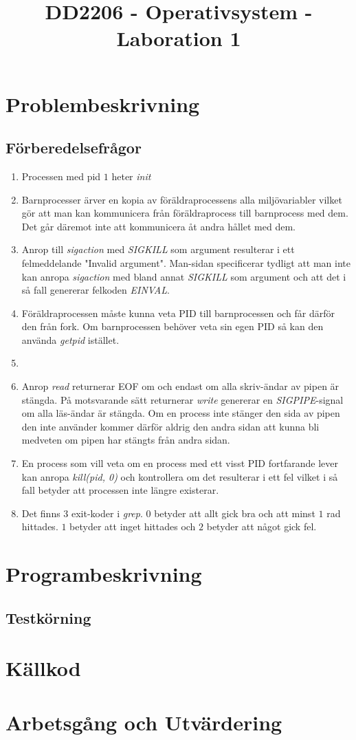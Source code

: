 \documentclass[10pt,a4paper]{article}
\title{DD2206 - Operativsystem - Laboration 1}
\begin{document}
\maketitle


\section{Problembeskrivning}

\subsection{Förberedelsefrågor}

\begin{enumerate}
\item Processen med pid $1$ heter \emph{init}
\item Barnprocesser ärver en kopia av föräldraprocessens alla miljövariabler vilket gör att man kan kommunicera från föräldraprocess till barnprocess med dem. Det går däremot inte att kommunicera åt andra hållet med dem.
\item Anrop till \emph{sigaction} med \emph{SIGKILL} som argument resulterar i ett felmeddelande "Invalid argument". Man-sidan specificerar tydligt att man inte kan anropa \emph{sigaction} med bland annat \emph{SIGKILL} som argument och att det i så fall genererar felkoden \emph{EINVAL}. 
\item Föräldraprocessen måste kunna veta PID till barnprocessen och får därför den från fork. Om barnprocessen behöver veta sin egen PID så kan den använda \emph{getpid} istället.
\item 
\item Anrop \emph{read} returnerar EOF om och endast om alla skriv-ändar av pipen är stängda. På motsvarande sätt returnerar \emph{write} genererar en \emph{SIGPIPE}-signal om alla läs-ändar är stängda. Om en process inte stänger den sida av pipen den inte använder kommer därför aldrig den andra sidan att kunna bli medveten om pipen har stängts från andra sidan.
\item En process som vill veta om en process med ett visst PID fortfarande lever kan anropa \emph{kill(pid, 0)} och kontrollera om det resulterar i ett fel vilket i så fall betyder att processen inte längre existerar.
\item Det finns 3 exit-koder i \emph{grep}. $0$ betyder att allt gick bra och att minst $1$ rad hittades. $1$ betyder att inget hittades och $2$ betyder att något gick fel.
\end{enumerate}

\section{Programbeskrivning}

\subsection{Testkörning}

\section{Källkod}

\section{Arbetsgång och Utvärdering}
\end{document}
